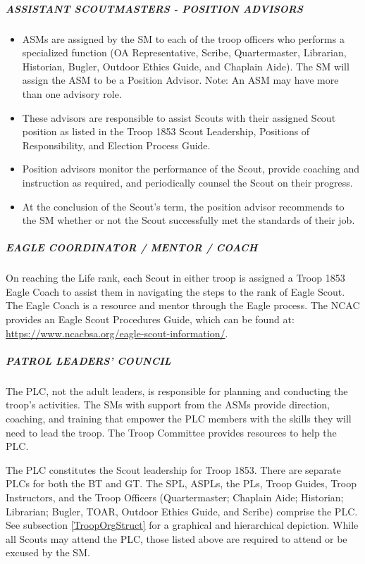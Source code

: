 \documentclass{ltxguide}
\begin{document}
\subparagraph{ASSISTANT SCOUTMASTERS - POSITION ADVISORS}
\begin{itemize}
	\item \acp{ASM} are assigned by the \ac{SM} to each of the troop officers who performs a specialized function (\ac{OA} Representative, Scribe, Quartermaster, Librarian, Historian, Bugler, Outdoor Ethics Guide, and Chaplain Aide). The \ac{SM} will assign the \ac{ASM} to be a Position Advisor. Note: An \ac{ASM} may have more than one advisory role.
	\item These advisors are responsible to assist Scouts with their assigned Scout position as listed in the Troop 1853 Scout Leadership, Positions of Responsibility, and Election Process Guide.
	\item Position advisors monitor the performance of the Scout, provide coaching and instruction as required, and periodically counsel the Scout on their progress.
	\item At the conclusion of the Scout's term, the position advisor recommends to the \ac{SM} whether or not the Scout successfully met the standards of their job.
\end{itemize}

\subparagraph{EAGLE COORDINATOR / MENTOR / COACH}
On reaching the Life rank, each Scout in either troop is assigned a Troop 1853 Eagle Coach to assist them in navigating the steps to the rank of Eagle Scout. The Eagle Coach is a resource and mentor through the Eagle process. The \ac{NCAC} provides an Eagle Scout Procedures Guide, which can be found at: \url{https://www.ncacbsa.org/eagle-scout-information/}.

\subparagraph{PATROL LEADERS' COUNCIL} 
The \ac{PLC}, not the adult leaders, is responsible for planning and conducting the troop's activities. The \acp{SM} with support from the \acp{ASM} provide direction, coaching, and training that empower the \ac{PLC} members with the skills they will need to lead the troop. The Troop Committee provides resources to help the \ac{PLC}.

The \ac{PLC} constitutes the Scout leadership for Troop 1853. There are separate \acp{PLC} for both the \ac{BT} and \ac{GT}. The \ac{SPL}, \acp{ASPL}, the \acp{PL}, Troop Guides, Troop Instructors, and the Troop Officers (Quartermaster; Chaplain Aide; Historian; Librarian; Bugler, \ac{TOAR}, Outdoor Ethics Guide, and Scribe) comprise the \ac{PLC}. See subsection \ref{TroopOrgStruct} for a graphical and hierarchical depiction. While all Scouts may attend the \ac{PLC}, those listed above are required to attend or be excused by the \ac{SM}.
\end{document}
